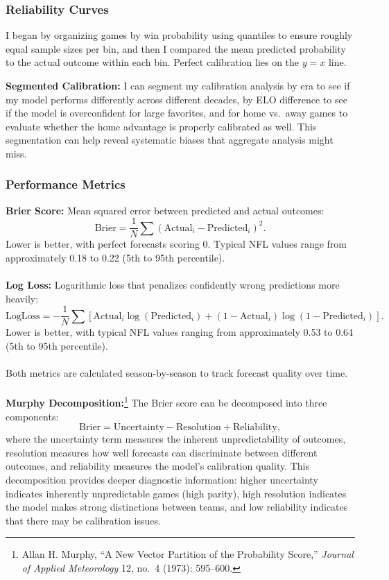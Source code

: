 \documentclass[a4paper,10.5pt,twoside]{article}
\begin{document}
\subsubsection{Reliability Curves}

I began by organizing games by win probability using quantiles to ensure roughly equal sample sizes per bin, and then I compared the mean predicted probability to the actual outcome within each bin. Perfect calibration lies on the $y=x$ line.

\textbf{Segmented Calibration:} I can segment my calibration analysis by era to see if my model performs differently across different decades, by ELO difference to see if the model is overconfident for large favorites, and for home vs.\ away games to evaluate whether the home advantage is properly calibrated as well. This segmentation can help reveal systematic biases that aggregate analysis might miss.

\subsubsection{Performance Metrics}

\textbf{Brier Score:} Mean squared error between predicted and actual outcomes:
\[
\text{Brier} = \frac{1}{N} \sum (\text{Actual}_i - \text{Predicted}_i)^2.
\]
Lower is better, with perfect forecasts scoring 0. Typical NFL values range from approximately 0.18 to 0.22 (5th to 95th percentile).\\
\\
\textbf{Log Loss:} Logarithmic loss that penalizes confidently wrong predictions more heavily:
\[
\text{LogLoss} = -\frac{1}{N} \sum [\text{Actual}_i \log(\text{Predicted}_i) + (1-\text{Actual}_i) \log(1-\text{Predicted}_i)].
\]
Lower is better, with typical NFL values ranging from approximately 0.53 to 0.64 (5th to 95th percentile). \\
\\
Both metrics are calculated season-by-season to track forecast quality over time.\\
\\
\textbf{Murphy Decomposition:}\footnote{Allan H. Murphy, ``A New Vector Partition of the Probability Score,'' \textit{Journal of Applied Meteorology} 12, no.\ 4 (1973): 595--600.} The Brier score can be decomposed into three components:
\[
\text{Brier} = \text{Uncertainty} - \text{Resolution} + \text{Reliability},
\]
where the uncertainty term measures the inherent unpredictability of outcomes, resolution measures how well forecasts can discriminate between different outcomes, and reliability measures the model's calibration quality. This decomposition provides deeper diagnostic information: higher uncertainty indicates inherently unpredictable games (high parity), high resolution indicates the model makes strong distinctions between teams, and low reliability indicates that there may be calibration issues.
\end{document}
